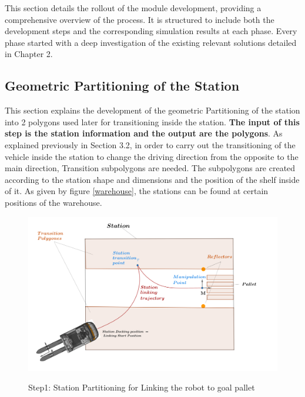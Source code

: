 This section details the rollout of the module development, providing a comprehensive overview of the process. 
It is structured to include both the development steps and the corresponding simulation results at each phase.
Every phase started with a deep investigation of the existing relevant solutions detailed in Chapter 2.

\subsection{Geometric Partitioning of the Station}
This section explains the development of the geometric Partitioning of the station into 2 polygons used later for 
transitioning inside the station. \textbf{The input of this step is the station information and the output are the polygons}.
As explained previously in Section 3.2, in order to carry out the transitioning of the vehicle inside 
the station to change the driving direction from the opposite to the main direction, Transition subpolygons are needed. 
The subpolygons are created according to the station shape and dimensions and the position of the shelf inside of it. 
As given by figure \ref{warehouse}, the stations can be found at certain positions of the warehouse.

\begin{figure}
    [!ht]
    \begin{center}
    \includegraphics[width=\linewidth]{images/Chap2/station-without-subpolygones (2).png}\\
    \caption{Step1: Station Partitioning for Linking the robot to goal pallet \cite{R28}}
    \label{subpolygons}
    \end{center}
\end{figure}

